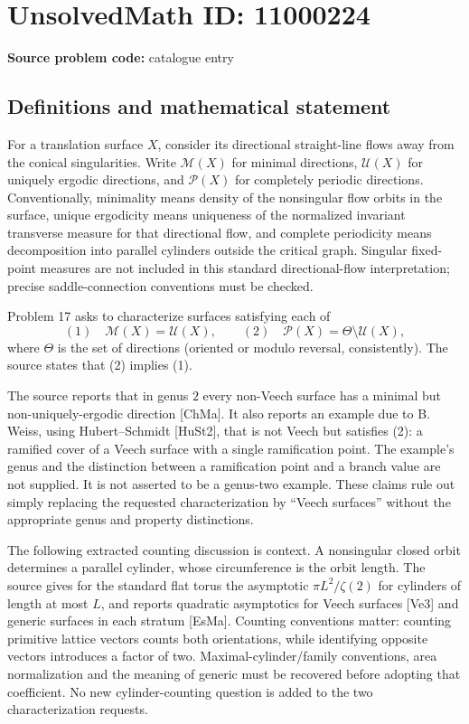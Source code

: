 \documentclass[11pt]{article}
\begin{document}
\section*{UnsolvedMath ID: 11000224}
\textbf{Source problem code:} catalogue entry
\subsection{Definitions and mathematical statement}
For a translation surface $X$, consider its directional straight-line flows away from the conical singularities. Write $\mathcal M(X)$ for minimal directions, $\mathcal U(X)$ for uniquely ergodic directions, and $\mathcal P(X)$ for completely periodic directions. Conventionally, minimality means density of the nonsingular flow orbits in the surface, unique ergodicity means uniqueness of the normalized invariant transverse measure for that directional flow, and complete periodicity means decomposition into parallel cylinders outside the critical graph. Singular fixed-point measures are not included in this standard directional-flow interpretation; precise saddle-connection conventions must be checked.

Problem 17 asks to characterize surfaces satisfying each of
\[
 (1)\quad\mathcal M(X)=\mathcal U(X),\qquad
 (2)\quad\mathcal P(X)=\Theta\setminus\mathcal U(X),
\]
where $\Theta$ is the set of directions (oriented or modulo reversal, consistently). The source states that (2) implies (1).

The source reports that in genus $2$ every non-Veech surface has a minimal but non-uniquely-ergodic direction [ChMa]. It also reports an example due to B. Weiss, using Hubert--Schmidt [HuSt2], that is not Veech but satisfies (2): a ramified cover of a Veech surface with a single ramification point. The example's genus and the distinction between a ramification point and a branch value are not supplied. It is not asserted to be a genus-two example. These claims rule out simply replacing the requested characterization by ``Veech surfaces'' without the appropriate genus and property distinctions.

The following extracted counting discussion is context. A nonsingular closed orbit determines a parallel cylinder, whose circumference is the orbit length. The source gives for the standard flat torus the asymptotic $\pi L^2/\zeta(2)$ for cylinders of length at most $L$, and reports quadratic asymptotics for Veech surfaces [Ve3] and generic surfaces in each stratum [EsMa]. Counting conventions matter: counting primitive lattice vectors counts both orientations, while identifying opposite vectors introduces a factor of two. Maximal-cylinder/family conventions, area normalization and the meaning of generic must be recovered before adopting that coefficient. No new cylinder-counting question is added to the two characterization requests.
\end{document}
